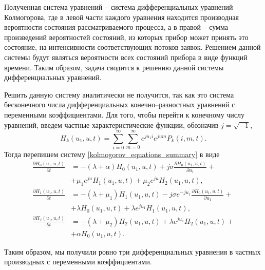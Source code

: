 Полученная система уравнений – система дифференциальных уравнений Колмогорова, где в левой части каждого уравнения находится производная вероятности состояния рассматриваемого процесса, а в правой – сумма произведений вероятностей состояний, из которых прибор может принять это состояние, на интенсивности соответствующих потоков заявок. Решением данной системы будут являться вероятности всех состояний прибора в виде функций времени. Таким образом, задача сводится к решению данной системы дифференциальных уравнений.

Решить данную систему аналитически не получится, так как это система бесконечного числа дифференциальных конечно--разностных уравнений с переменными коэффициентами. 
Для того, чтобы перейти к конечному числу уравнений, введем частные характеристические функции, обозначив $j=\sqrt{-1}$,
\begin{equation*}
	H_{k}(u_{1},u,t) = \sum_{i=0}^{\infty}
	\sum_{m=0}^{\infty}  
	e^{ju_{1}i}e^{jum} P_{k}(i,m,t).
\end{equation*}
Тогда перепишем систему \eqref{kolmogorov_equations_summary} в виде
\begin{equation} \label{characteristic_equations_summary}
	\begin{split}
		\frac{{\partial H_{0}(u_{1},u,t)}}{{\partial t}} &= -(\lambda + \alpha)H_{0}(u_{1},u,t) + j\sigma
		\frac{{\partial H_{0}(u_{1},u,t)}}{{\partial u_{1}}} +\\  &+ \mu_{1} e^{ju}H_{1}(u_{1},u,t) + \mu_{2}e^{ju}H_{2}(u_{1},u,t) ,
		\\
		\frac{{\partial H_{1}(u_{1},u,t)}}{{\partial t}} &= -(\lambda + \mu_{1})H_{1}(u_{1},u,t) - j\sigma e^{-ju_{1}}
		\frac{{\partial H_{0}(u_{1},u,t)}}{{\partial u_{1}}} +\\  &+ \lambda H_{0}(u_{1},u,t) + \lambda e^{ju_{1}}H_{1}(u_{1},u,t) ,
		\\
		\frac{{\partial H_{2}(u_{1},u,t)}}{{\partial t}} &= -(\lambda + \mu_{2})H_{2}(u_{1},u,t)  + \lambda e^{ju_{1}}H_{2}(u_{1},u,t) +\\  &+ \alpha H_{0}(u_{1},u,t).
	\end{split}
\end{equation}  

Таким образом, мы получили ровно три дифференциальных уравнения в частных производных с переменными коэффициентами.
